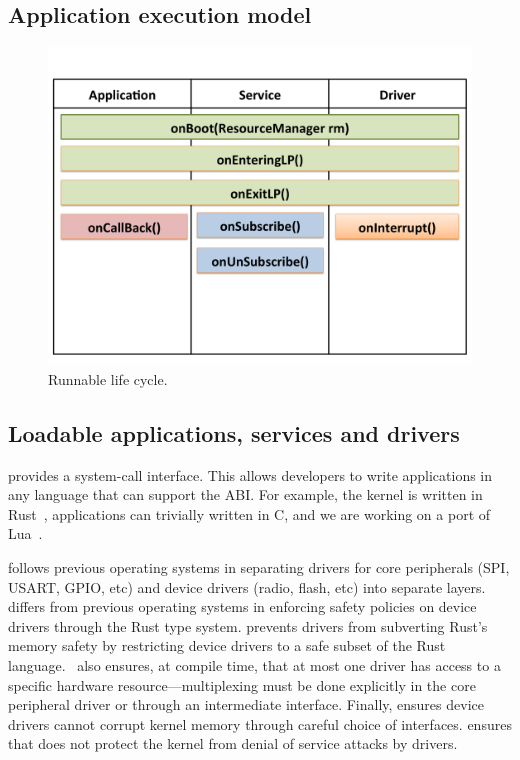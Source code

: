 \subsection{Application execution model}
\begin{figure}
 \centering
\includegraphics[width=1\columnwidth]{img/appcycle.png}
\caption{Runnable life cycle.}
 \label{fig:appcycle}
\end{figure}


\subsection{Loadable applications, services and drivers}

\name provides a system-call interface. This
allows developers to write applications in any language that can support the
ABI. For example, the \name kernel is written in Rust~\cite{rust}, applications
can trivially written in C, and we are working on a port of Lua~\cite{lua}.

 \name follows previous operating systems in separating
drivers for core peripherals (SPI, USART, GPIO, etc) and device drivers (radio,
flash, etc) into separate layers. \name differs from previous operating systems
in enforcing safety policies on device drivers through the Rust type system.
\name prevents drivers from subverting Rust's memory safety by restricting
device drivers to a safe subset of the Rust language.~ \name
also ensures, at compile time, that at most one driver has access to a specific
hardware resource---multiplexing must be done explicitly in the core peripheral
driver or through an intermediate interface. Finally, \name ensures device
drivers cannot corrupt kernel memory through careful choice of interfaces. \name
ensures that \name does not protect the kernel from denial of service attacks by
drivers.

